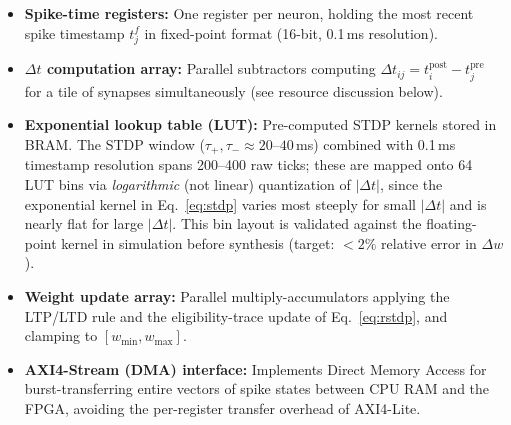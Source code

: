\documentclass[11pt,a4paper]{article}
\begin{document}
\begin{itemize}[leftmargin=*, itemsep=2pt]
  \item \textbf{Spike-time registers:} One register per neuron, holding the most recent
        spike timestamp $t_j^f$ in fixed-point format (16-bit, 0.1\,ms resolution).
  \item \textbf{$\Delta t$ computation array:} Parallel subtractors computing
        $\Delta t_{ij} = t_i^{\mathrm{post}} - t_j^{\mathrm{pre}}$ for a tile of
        synapses simultaneously (see resource discussion below).
  \item \textbf{Exponential lookup table (LUT):} Pre-computed STDP kernels stored in
        BRAM. The STDP window ($\tau_+,\tau_- \approx 20$--$40$\,ms) combined with
        0.1\,ms timestamp resolution spans 200--400 raw ticks; these are mapped onto
        64 LUT bins via \emph{logarithmic} (not linear) quantization of
        $|\Delta t|$, since the exponential kernel in Eq.~\eqref{eq:stdp} varies most
        steeply for small $|\Delta t|$ and is nearly flat for large $|\Delta t|$.
        This bin layout is validated against the floating-point kernel in simulation
        before synthesis (target: $<2\%$ relative error in $\Delta w$).
  \item \textbf{Weight update array:} Parallel multiply-accumulators applying the
        LTP/LTD rule and the eligibility-trace update of Eq.~\eqref{eq:rstdp}, and
        clamping to $[w_{\min}, w_{\max}]$.
  \item \textbf{AXI4-Stream (DMA) interface:} Implements Direct Memory Access for
        burst-transferring entire vectors of spike states between CPU RAM and the
        FPGA, avoiding the per-register transfer overhead of AXI4-Lite.
\end{itemize}
\end{document}
